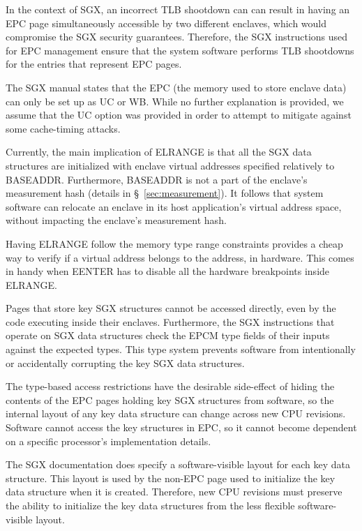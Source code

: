 In the context of SGX, an incorrect TLB shootdown can can result in having an
EPC page simultaneously accessible by two different enclaves, which would
compromise the SGX security guarantees. Therefore, the SGX instructions used
for EPC management ensure that the system software performs TLB shootdowns for
the entries that represent EPC pages.


The SGX manual states that the EPC (the memory used to store enclave data) can
only be set up as UC or WB. While no further explanation is provided, we assume
that the UC option was provided in order to attempt to mitigate against some
cache-timing attacks.


Currently, the main implication of ELRANGE is that all the SGX data structures
are initialized with enclave virtual addresses specified relatively to
BASEADDR. Furthermore, BASEADDR is not a part of the enclave's measurement
hash (details in \S~\ref{sec:measurement}). It follows that system software can
relocate an enclave in its host application's virtual address space, without
impacting the enclave's measurement hash.

Having ELRANGE follow the memory type range constraints provides a cheap way to
verify if a virtual address belongs to the address, in hardware. This comes in
handy when EENTER has to disable all the hardware breakpoints inside ELRANGE.



Pages that store key SGX structures cannot be accessed directly, even by the
code executing inside their enclaves. Furthermore, the SGX instructions that
operate on SGX data structures check the EPCM type fields of their inputs
against the expected types. This type system prevents software from
intentionally or accidentally corrupting the key SGX data structures.

The type-based access restrictions have the desirable side-effect of hiding the
contents of the EPC pages holding key SGX structures from software, so the
internal layout of any key data structure can change across new CPU revisions.
Software cannot access the key structures in EPC, so it cannot become dependent
on a specific processor's implementation details.

The SGX documentation does specify a software-visible layout for each key data
structure. This layout is used by the non-EPC page used to initialize the key
data structure when it is created. Therefore, new CPU revisions must preserve
the ability to initialize the key data structures from the less flexible
software-visible layout.



